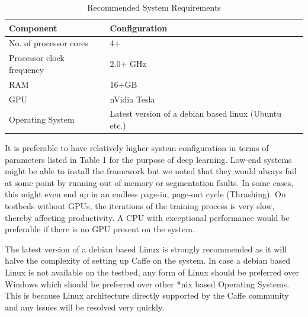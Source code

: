 \documentclass{article}
\begin{document}
\begin{table}[bpht!]
	\centering
	\caption{Recommended System Requirements}
	\begin{tabular}{|l|l|}
		\hline
		\textbf{Component} & \textbf{Configuration}\\
		\hline
		No. of processor cores & 4+ \\
		Processor clock frequency & 2.0+ GHz\\
		RAM & 16+GB\\
		GPU & nVidia Tesla\\
		Operating System & Latest version of a debian based linux (Ubuntu etc.) \\
		\hline
	\end{tabular}
\end{table}
It is preferable to have relatively higher system configuration in terms of parameters listed in Table 1 for the purpose of deep learning. Low-end systems might be able to install the framework but we noted that they would always fail at some point by running out of memory or segmentation faults. In some cases, this might even end up in an endless page-in, page-out cycle (Thrashing). On testbeds without GPUs, the iterations of the training process is very slow, thereby affecting productivity. A CPU with exceptional performance would be preferable if there is no GPU present on the system.
\par
The latest version of a debian based Linux is strongly recommended as it will halve the complexity of setting up Caffe on the system. In case a debian based Linux is not available on the testbed, any form of Linux should be preferred over Windows which should be preferred over other *nix based Operating Systems. This is because Linux architecture directly supported by the Caffe community and any issues will be resolved very quickly.
\end{document}
